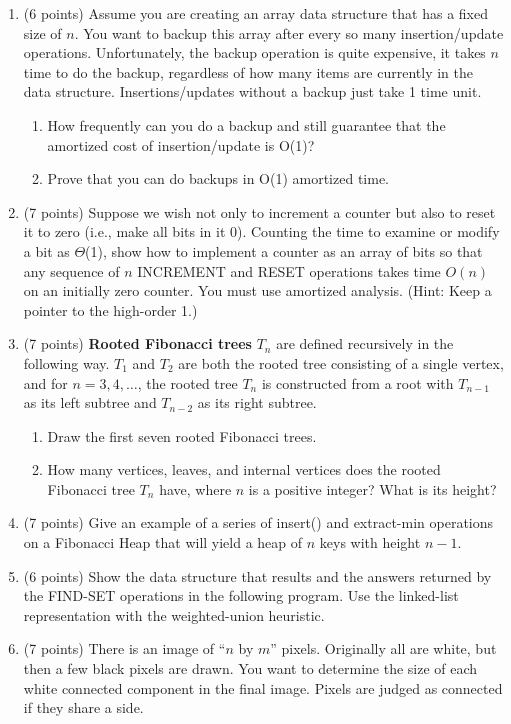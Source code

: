 \documentclass[12pt]{report}
\begin{document}
\maketitle

\begin{enumerate}[label=\arabic*.]
	\item (6 points) Assume you are creating an array data structure that has a fixed size of $n$. You want to backup this array after every so many insertion/update operations. Unfortunately, the backup operation is quite expensive, it takes $n$ time to do the backup, regardless of how many items are currently in the data structure. Insertions/updates without a backup just take 1 time unit.
	\begin{enumerate}[label=\arabic{enumi}\alph*)]
	    \item How frequently can you do a backup and still guarantee that the amortized cost of insertion/update is O(1)?
		\item Prove that you can do backups in O(1) amortized time.
	\end{enumerate}
	\item (7 points) Suppose we wish not only to increment a counter but also to reset it to zero (i.e., make all bits in it 0). Counting the time to examine or modify a bit as $\Theta$(1), show how to implement a counter as an array of bits so that any sequence of $n$ INCREMENT and RESET operations takes time $O(n)$ on an initially zero counter. You must use amortized analysis. (Hint: Keep a pointer to the high-order 1.)
	\item (7 points) \textbf{Rooted Fibonacci trees} $T_{n}$ are defined recursively in the following way. $T_{1}$ and $T_{2}$ are both the rooted tree consisting of a single vertex, and for $n=3,4,\dots$, the rooted tree $T_{n}$ is constructed from a root with $T_{n-1}$ as its left subtree and $T_{n-2}$ as its right subtree.
	\begin{enumerate}[label=\arabic{enumi}\alph*)]
	    \item Draw the first seven rooted Fibonacci trees.
		\item How many vertices, leaves, and internal vertices does the rooted Fibonacci tree $T_{n}$ have, where $n$ is a positive integer? What is its height?
	\end{enumerate}
	\item (7 points) Give an example of a series of insert() and extract-min operations on a Fibonacci Heap that will yield a heap of $n$ keys with height $n-1$.
	\item (6 points)
Show the data structure that results and the answers returned by the FIND-SET operations in the following program. Use the linked-list representation with the weighted-union heuristic.	%
	\item (7 points) There is an image of ``$n$ by $m$'' pixels. Originally all are white, but then a few black pixels are drawn. You want to determine the size of each white connected component in the final image. Pixels are judged as connected if they share a side.
\end{enumerate}
\end{document}
